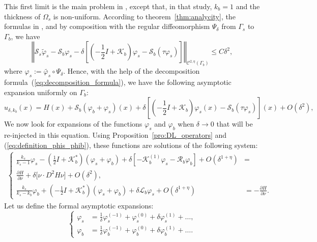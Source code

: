 \documentclass[final]{siamltex}
\numberwithin{equation}{section}
\numberwithin{figure}{section}
\numberwithin{table}{section}
\begin{document}
This first limit is the main problem in \cite[chapter
3]{zribilayer}, except that, in that study, $k_{b}=1$ and the
thickness of $\Omega_{s}$ is non-uniform. According to
theorem~\ref{thm:analycity}, the formulas in
\cite{crisoforis2004}, and by composition with the regular
diffeomorphism $\Psi_{\delta}$ from $\Gamma_{s}$ to $\Gamma_{b}$,
we have
\[
\left\Vert
\mathcal{S}_{s}\tilde{\varphi}_{s}-\mathcal{S}_{b}\varphi_{s}-\delta\left[\left(-\frac{1}{2}I+\mathcal{K}_{b}\right)\varphi_{s}-\mathcal{S}_{b}(\tau\varphi_{s})\right]
\right\Vert _{\mathcal{C}^{2,\eta}(\Gamma_{b})}\leq C\delta^{2},
\]
 where $\varphi_{s}:=\tilde{\varphi_{s}}\circ\Psi_{\delta}$. Hence,
with the help of the decomposition formula~(\ref{eq:decomposition_formula}),
we have the following asymptotic expansion uniformly on $\Gamma_{b}$:
\begin{equation}
u_{\delta,k_{b}}(x)=H(x)+\mathcal{S}_{b}(\varphi_{b}+\varphi_{s})(x)+\delta\left[\left(-\frac{1}{2}I+\mathcal{K}_{b}\right)\varphi_{s}(x)-\mathcal{S}_{b}(\tau\varphi_{s})\right](x)+O(\delta^{2}),\label{eq:DL_u}
\end{equation}
 We now look for expansions of the functions $\varphi_{s}$
and $\varphi_{b}$ when $\delta\rightarrow0$ that will be re-injected
in this equation. Using Proposition~\ref{pro:DL_operators} and (\ref{eq:definition_phis_phib}),
these functions are solutions of the following system:
\begin{multline}
\left\{ \begin{alignedat}{1}\frac{k_{s}}{k_{s}-1}\varphi_{s}-\left(\frac{1}{2}I+\mathcal{K}_{b}^{*}\right)(\varphi_{s}+\varphi_{b})+\delta\left[-\mathcal{K}_{b}^{(1)}\varphi_{s}-\mathcal{R}_{b}\varphi_{b}\right]+O(\delta^{1+\eta}) & =\\
\frac{\partial H}{\partial\nu}+\delta \big[\nu \cdot D^{2}H\nu \big]  +O(\delta^{2}),\\
\frac{k_{s}}{k_{s}-k_{b}}\varphi_{b}+\left(-\frac{1}{2}I+\mathcal{K}_{b}^{*}\right)(\varphi_{s}+\varphi_{b})
+\delta\mathcal{L}_{b}\varphi_{s}+O(\delta^{1+\eta}) &
=-\frac{\partial H}{\partial\nu}.
\end{alignedat}
\right.\label{eq:modified_system}
\end{multline}
 Let us define the formal asymptotic expansions:
\[
\left\{ \begin{alignedat}{1}\varphi_{s} & =\frac{1}{\delta}\varphi_{s}^{(-1)}+\varphi_{s}^{(0)}+\delta\varphi_{s}^{(1)}+\ldots,\\
\varphi_{b} & =\frac{1}{\delta}\varphi_{b}^{(-1)}+\varphi_{b}^{(0)}+\delta\varphi_{b}^{(1)}+\ldots.
\end{alignedat}
\right.
\]
\end{document}
